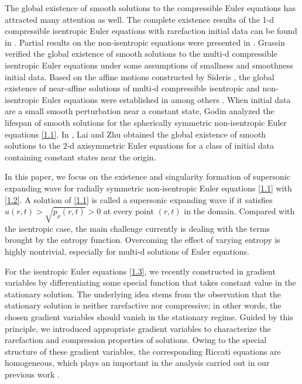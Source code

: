 \documentclass[11pt,reqno]{article}
\numberwithin{equation}{section}
\begin{document}
The global existence of smooth solutions to the compressible Euler equations has attracted many attention as well. The complete existence results of the 1-d compressible isentropic Euler equations with rarefaction initial data can be found in \cite{lax2, CCZ, CPZ}. Partial results on the non-isentropic equations were presented in \cite{CCZ, CPZ, CY, Zhu}. Grassin \cite{Grassin} verified the global existence of smooth solutions to the multi-d compressible isentropic Euler equations under some assumptions of smallness and smoothness initial data. Based on the affine motions constructed by Sideris \cite{sideris1}, the global existence of near-affine solutions of multi-d compressible isentropic and non-isentropic Euler equations were established in among others \cite{HJ, Rickard1, Rickard2, SS}. When initial data are a small smooth perturbation near a constant state, Godin \cite{Godin} analyzed the lifespan of smooth solutions for the spherically symmetric non-isentropic Euler equations \eqref{1.1}. In \cite{Lai}, Lai and Zhu obtained the global existence of smooth solutions to the 2-d axisymmetric Euler equations for a class of initial data containing constant states near the origin.

In this paper, we focus on the existence and singularity formation of supersonic expanding wave for radially symmetric non-isentropic Euler equations \eqref{1.1} with \eqref{1.2}. A solution of \eqref{1.1} is called a supersonic expanding wave if it satisfies $u(r,t)>\sqrt{p_\rho(r,t)}>0$ at every point $(r,t)$ in the domain.
Compared with the isentropic case, the main challenge currently is dealing with the terms brought by the entropy function. Overcoming the effect of varying entropy is highly nontrivial, especially for multi-d solutions of Euler equations.

For the isentropic Euler equations \eqref{1.3}, we recently constructed in \cite{CEHS1} gradient variables by differentiating some special function that takes constant value in the stationary solution. The underlying idea stems from the observation that the stationary solution is neither rarefactive nor compressive; in other words, the chosen gradient variables should vanish in the stationary regime. Guided by this principle, we introduced appropriate gradient variables to characterize the rarefaction and compression properties of solutions. Owing to the special structure of these gradient variables, the corresponding Riccati equations are homogeneous, which plays an important in the analysis carried out in our previous work \cite{CEHS1}.
\end{document}
